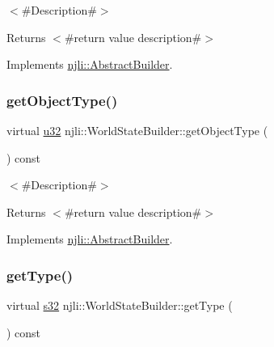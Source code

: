 $<$\#\+Description\#$>$

\begin{DoxyReturn}{Returns}
$<$\#return value description\#$>$ 
\end{DoxyReturn}


Implements \mbox{\hyperlink{classnjli_1_1_abstract_builder_a902f73ea78031b06aca183a417f3413b}{njli\+::\+Abstract\+Builder}}.

\mbox{\label{classnjli_1_1_world_state_builder_ad66b2b539e4c464ab42f933f7ee377eb}} 
\subsubsection{\texorpdfstring{get\+Object\+Type()}{getObjectType()}}
{\footnotesize\ttfamily virtual \mbox{\hyperlink{_util_8h_a10e94b422ef0c20dcdec20d31a1f5049}{u32}} njli\+::\+World\+State\+Builder\+::get\+Object\+Type (\begin{DoxyParamCaption}{ }\end{DoxyParamCaption}) const\hspace{0.3cm}{\ttfamily [virtual]}}

$<$\#\+Description\#$>$

\begin{DoxyReturn}{Returns}
$<$\#return value description\#$>$ 
\end{DoxyReturn}


Implements \mbox{\hyperlink{classnjli_1_1_abstract_builder_a0f2d344fcf697b167f4f2b1122b5fb33}{njli\+::\+Abstract\+Builder}}.

\mbox{\label{classnjli_1_1_world_state_builder_ae6385f56dc9da2bc22ba5016b7010b15}} 
\subsubsection{\texorpdfstring{get\+Type()}{getType()}}
{\footnotesize\ttfamily virtual \mbox{\hyperlink{_util_8h_aa62c75d314a0d1f37f79c4b73b2292e2}{s32}} njli\+::\+World\+State\+Builder\+::get\+Type (\begin{DoxyParamCaption}{ }\end{DoxyParamCaption}) const\hspace{0.3cm}{\ttfamily [virtual]}}


